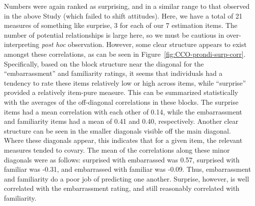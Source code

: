 Numbers were again ranked as surprising, and in a similar range to that observed
in the above Study (which failed to shift attitudes). Here, we have a total of
21 measures of something like surprise, 3 for each of our 7 estimation items.
The number of potential relationships is large here, so we must be cautious in
over-interpreting \emph{post hoc} observation. However, some clear structure
appears to exist amongst these correlations, as can be seen in
Figure~\ref{fig:CCO-prondi-surp-corr}. Specifically, based on the block
structure near the diagonal for the “embarrassment” and familiarity ratings, it
seems that individuals had a tendency to rate these items relatively low or high
across items, while “surprise” provided a relatively item-pure measure. This can
be summarized statistically with the averages of the off-diagonal correlations
in these blocks. The surprise items had a mean correlation with each other of
0.14, while the embarrassment and familiarity items had a mean of 0.41 and 0.40,
respectively. Another clear structure can be seen in the smaller diagonals
visible off the main diagonal. Where these diagonals appear, this indicates that
for a given item, the relevant measures tended to covary. The mean of the
correlations along these minor diagonals were as follows: surprised with
embarrassed was 0.57, surprised with familiar was -0.31, and embarrassed with
familiar was -0.09. Thus, embarrassment and familiarity do a poor job of
predicting one another. Surprise, however, is well correlated with the
embarrassment rating, and still reasonably correlated with familiarity.


